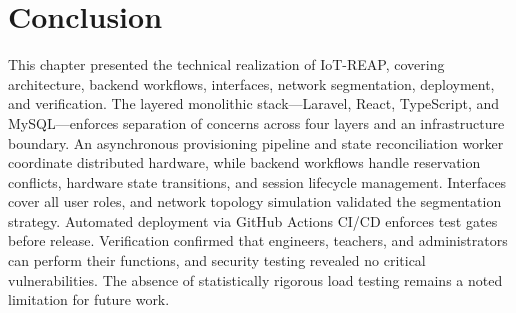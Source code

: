 \section*{Conclusion}

This chapter presented the technical realization of IoT-REAP, covering architecture, backend workflows, interfaces, network segmentation, deployment, and verification. The layered monolithic stack—Laravel, React, TypeScript, and MySQL—enforces separation of concerns across four layers and an infrastructure boundary. An asynchronous provisioning pipeline and state reconciliation worker coordinate distributed hardware, while backend workflows handle reservation conflicts, hardware state transitions, and session lifecycle management. Interfaces cover all user roles, and network topology simulation validated the segmentation strategy. Automated deployment via GitHub Actions CI/CD enforces test gates before release. Verification confirmed that engineers, teachers, and administrators can perform their functions, and security testing revealed no critical vulnerabilities. The absence of statistically rigorous load testing remains a noted limitation for future work.

\cleardoublepage